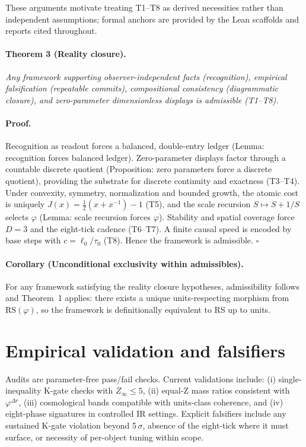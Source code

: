 \documentclass[11pt]{article}
\begin{document}
These arguments motivate treating T1--T8 as derived necessities rather than independent assumptions; formal anchors are provided by the Lean scaffolds and reports cited throughout.

\paragraph{Theorem 3 (Reality closure).} \emph{Any framework supporting observer\mbox{-}independent facts (recognition), empirical falsification (repeatable commits), compositional consistency (diagrammatic closure), and zero\mbox{-}parameter dimensionless displays is admissible (T1--T8).}

\paragraph{Proof.} Recognition as readout forces a balanced, double\mbox{-}entry ledger (Lemma: recognition forces balanced ledger). Zero\mbox{-}parameter displays factor through a countable discrete quotient (Proposition: zero parameters force a discrete quotient), providing the substrate for discrete continuity and exactness (T3--T4). Under convexity, symmetry, normalization and bounded growth, the atomic cost is uniquely \(J(x)=\tfrac12(x+x^{-1})-1\) (T5), and the scale recursion \(S\mapsto S+1/S\) selects \(\varphi\) (Lemma: scale recursion forces \(\varphi\)). Stability and spatial coverage force \(D=3\) and the eight\mbox{-}tick cadence (T6--T7). A finite causal speed is encoded by base steps with \(c=\ell_0/\tau_0\) (T8). Hence the framework is admissible. \hfill$\square$

\paragraph{Corollary (Unconditional exclusivity within admissibles).} For any framework satisfying the reality closure hypotheses, admissibility follows and Theorem~1 applies: there exists a unique units\mbox{-}respecting morphism from \(\mathrm{RS}(\varphi)\), so the framework is definitionally equivalent to RS up to units.

\section{Empirical validation and falsifiers}\label{sec:empirical}
Audits are parameter\mbox{-}free pass/fail checks. Current validations include: (i) single\mbox{-}inequality K\mbox{-}gate checks with \(Z_\infty\le 5\), (ii) equal\mbox{-}Z mass ratios consistent with \(\varphi^{\Delta r}\), (iii) cosmological bands compatible with units\mbox{-}class coherence, and (iv) eight\mbox{-}phase signatures in controlled IR settings. Explicit falsifiers include any sustained K\mbox{-}gate violation beyond 5\,\(\sigma\), absence of the eight\mbox{-}tick where it must surface, or necessity of per\mbox{-}object tuning within scope.
\end{document}
